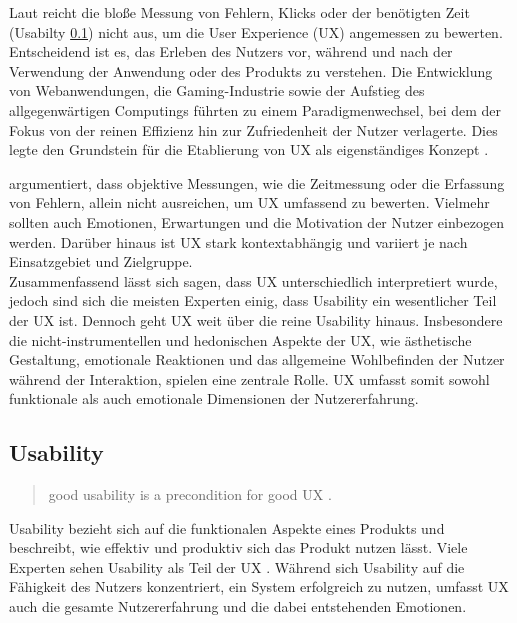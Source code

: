 \documentclass[12pt,oneside]{article}
\begin{document}
Laut \cite{GOISTAI} reicht die bloße Messung von Fehlern, Klicks oder der benötigten Zeit (Usabilty \ref{sec:usability}) nicht aus, um die User Experience (UX) angemessen zu bewerten. Entscheidend ist es, das Erleben des Nutzers vor, während und nach der Verwendung der Anwendung oder des Produkts zu verstehen. Die Entwicklung von Webanwendungen, die Gaming-Industrie sowie der Aufstieg des allgegenwärtigen Computings führten zu einem Paradigmenwechsel, bei dem der Fokus von der reinen Effizienz hin zur Zufriedenheit der Nutzer verlagerte. Dies legte den Grundstein für die Etablierung von UX als eigenständiges Konzept \cite{glanznig}.

\cite{Virpi} argumentiert, dass objektive Messungen, wie die Zeitmessung oder die Erfassung von Fehlern, allein nicht ausreichen, um UX umfassend zu bewerten. Vielmehr sollten auch Emotionen, Erwartungen und die Motivation der Nutzer einbezogen werden. Darüber hinaus ist UX stark kontextabhängig und variiert je nach Einsatzgebiet und Zielgruppe.\\
Zusammenfassend lässt sich sagen, dass UX unterschiedlich interpretiert wurde, jedoch sind sich die meisten Experten einig, dass Usability ein wesentlicher Teil der UX ist. Dennoch geht UX weit über die reine Usability hinaus. Insbesondere die nicht-instrumentellen und hedonischen Aspekte der UX, wie ästhetische Gestaltung, emotionale Reaktionen und das allgemeine Wohlbefinden der Nutzer während der Interaktion, spielen eine zentrale Rolle. UX umfasst somit sowohl funktionale als auch emotionale Dimensionen der Nutzererfahrung.


\subsection{Usability}\label{sec:usability}
\begin{quote} good usability is a precondition for good UX \cite{glanznig}.\end{quote}
Usability bezieht sich auf die funktionalen Aspekte eines Produkts und beschreibt, wie effektiv und produktiv sich das Produkt nutzen lässt. Viele Experten sehen Usability als Teil der UX \cite{GOISTAI}. Während sich Usability auf die Fähigkeit des Nutzers konzentriert, ein System erfolgreich zu nutzen, umfasst UX auch die gesamte Nutzererfahrung und die dabei entstehenden Emotionen.
\end{document}
